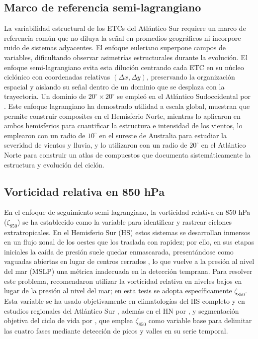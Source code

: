 \subsection{Marco de referencia semi-lagrangiano}\label{subsec:tb_lagrangiano}
La variabilidad estructural de los ETCs del Atlántico Sur requiere un marco de referencia común que no diluya la señal en promedios geográficos ni incorpore ruido de sistemas adyacentes.
El enfoque euleriano superpone campos de variables, dificultando observar asimetrías estructurales durante la evolución.
El enfoque semi-lagrangiano evita esta dilución centrando cada ETC en su núcleo ciclónico con coordenadas relativas $(\Delta x, \Delta y)$, preservando la organización espacial y aislando su señal dentro de un dominio que se desplaza con la trayectoria.
Un dominio de $20^{\circ} \times 20^{\circ}$ se empleó en el Atlántico Sudoccidental por \citet{cardoso2022synoptic}. 
Este enfoque lagrangiano ha demostrado utilidad a escala global, \citet{laurila2021characteristics} muestran que permite construir composites en el Hemisferio Norte, mientras \citet{priestley2022improved} lo aplicaron en ambos hemisferios para cuantificar la estructura e intensidad de los vientos, \citet{pepler2020dimensional} lo emplearon con un radio de $10^{\circ}$ en el sureste de Australia para estudiar la severidad de vientos y lluvia, y \citet{dacre2012atlas} lo utilizaron con un radio de $20^{\circ}$ en el Atlántico Norte para construir un atlas de compuestos que documenta sistemáticamente la estructura y evolución del ciclón.

\subsection{Vorticidad relativa en 850 hPa}\label{subsec:tb_zeta}
En el enfoque de seguimiento semi-lagrangiano, la vorticidad relativa en 850 hPa ($\zeta_{850}$) se ha establecido como la variable para identificar y rastrear ciclones extratropicales.
En el Hemisferio Sur (HS) estos sistemas se desarrollan inmersos en un flujo zonal de los oestes que los traslada con rapidez; por ello, en sus etapas iniciales la caída de presión suele quedar enmascarada, presentándose como vaguadas abiertas en lugar de centros cerrados \citep{sinclair1994objective}, lo que vuelve a la presión al nivel del mar (MSLP) una métrica inadecuada en la detección temprana.
Para resolver este problema, \citet{sinclair1997objective} recomendaron utilizar la vorticidad relativa en niveles bajos en lugar de la presión al nivel del mar; en esta tesis se adopta específicamente $\zeta_{850}$.
Esta variable se ha usado objetivamente en climatologías del HS completo \citep{padilhareinke2024objective} y en estudios regionales del Atlántico Sur \citep{gramcianinov2019properties}, además en el HN por \citet{corner2025classification}, y segmentación objetiva del ciclo de vida por \citet{coutodesouza2024new}, que emplea $\zeta_{850}$ como variable base para delimitar las cuatro fases mediante detección de picos y valles en su serie temporal.

